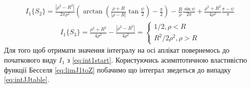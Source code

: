%
\begin{equation*} \begin{aligned}
I_1 \{ S_2 \} = \frac{ | \rho^2 - R^2 | }{2 \pi \rho^2} \left(
\arctan \left( \frac{\rho + R}{ | \rho - R | } \tan \frac{\psi}{2} \right) -  
\frac{\pi}{2} \right) - \frac{R}{\rho} \frac{\sin \psi}{2 \pi} + 
\frac{\rho^2 + R^2}{4 \rho^2} \frac{\pi - \psi}{\pi}
\end{aligned} \end{equation*}
%
%
\begin{equation*} \begin{aligned}
I_1 \{ S_3 \} = \frac{\rho^2 + R^2}{4 \rho^2} - 
\frac{ |\rho^2 - R^2| }{4 \rho^2} = \begin{cases}
1/2 , \rho < R \\
R^2 / 2 \rho^2, \rho > R
\end{cases}
\end{aligned} \end{equation*}
%
Для того щоб отримати значення інтегралу на осі аплікат повернемось до 
початкового виду $ I_1 $ з \eqref{eq:int1start}. Користуючись асимптотичною 
властивістю функції Бесселя \eqref{eq:limJ1toZ} побачимо що інтеграл 
зведеться до випадку \eqref{eq:intJJtable}.
%
